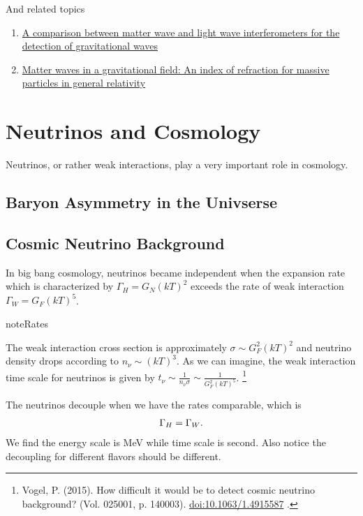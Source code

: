 \documentclass[letterpaper,12pt,english]{sphinxmanual}
\begin{document}
And related topics
\begin{enumerate}
\item {} 
\href{http://arxiv.org/abs/gr-qc/0609075}{A comparison between matter wave and light wave interferometers for the detection of gravitational waves}

\item {} 
\href{http://arxiv.org/abs/gr-qc/0107063}{Matter waves in a gravitational field: An index of refraction for massive particles in general relativity}

\end{enumerate}


\chapter{Neutrinos and Cosmology}
\label{cosmology:neutrinos-and-cosmology}\label{cosmology::doc}
Neutrinos, or rather weak interactions, play a very important role in cosmology.


\section{Baryon Asymmetry in the Univserse}
\label{cosmology:baryon-asymmetry-in-the-univserse}

\section{Cosmic Neutrino Background}
\label{cosmology:cosmic-neutrino-background}\label{cosmology:index-1}
In big bang cosmology, neutrinos became independent when the expansion rate which is characterized by \(\Gamma_H=G_N (kT)^2\) exceeds the rate of weak interaction \(\Gamma_W=G_F (kT)^5\).

\begin{notice}{note}{Rates}

The weak interaction cross section is approximately \(\sigma\sim G_F^2 (kT)^2\) and neutrino density drops according to \(n_\nu \sim (kT)^3\). As we can imagine, the weak interaction time scale for neutrinos is given by \(t_\nu \sim \frac{1}{n_\nu \sigma} \sim \frac{1}{G_F^2(kT)^5}\). \footnote[1]{
Vogel, P. (2015). How difficult it would be to detect cosmic neutrino background? (Vol. 025001, p. 140003). \href{http://dx.doi.org/10.1063/1.4915587}{doi:10.1063/1.4915587} .
}
\end{notice}

The neutrinos decouple when we have the rates comparable, which is
\begin{gather}
\begin{split}\Gamma_H = \Gamma_W.\end{split}\notag
\end{gather}
We find the energy scale is MeV while time scale is second. Also notice the decoupling for different flavors should be different.
\end{document}
